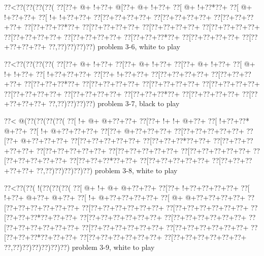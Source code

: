 \vbox{\vbox{\goo
\0??<\0??(\0??(\0??(\0??(
\0??[\0??+\- @+\- !+\0??+
\- @[\0??+\- @+\- !+\0??+
\0??[\- @+\- !+\0??*\0??+
\0??[\- @+\- !+\0??+\0??+
\0??[\- !+\- !+\0??+\0??+
\0??[\0??+\0??+\0??+\0??+
\0??[\0??+\0??+\0??+\0??+
\0??[\0??+\0??+\0??+\0??+
\0??[\0??+\0??+\0??*\0??+
\0??[\0??+\0??+\0??+\0??+
\0??[\0??+\0??+\0??+\0??+
\0??[\0??+\0??+\0??+\0??+
\0??[\0??+\0??+\0??+\0??+
\0??[\0??+\0??+\0??+\0??+
\0??[\0??+\0??+\0??*\0??+
\0??[\0??+\0??+\0??+\0??+
\0??[\0??+\0??+\0??+\0??+
\0??,\0??)\0??)\0??)\0??)
}
\hfil problem 3-6, white to play\hfil\break
}

\vbox{\vbox{\goo
\0??<\0??(\0??(\0??(\0??(
\0??[\0??+\- @+\- !+\0??+
\0??[\0??+\- @+\- !+\0??+
\0??[\0??+\- @+\- !+\0??+
\0??[\- @+\- !+\- !+\0??+
\0??[\- !+\0??+\0??+\0??+
\0??[\0??+\- !+\0??+\0??+
\0??[\0??+\0??+\0??+\0??+
\0??[\0??+\0??+\0??+\0??+
\0??[\0??+\0??+\0??*\0??+
\0??[\0??+\0??+\0??+\0??+
\0??[\0??+\0??+\0??+\0??+
\0??[\0??+\0??+\0??+\0??+
\0??[\0??+\0??+\0??+\0??+
\0??[\0??+\0??+\0??+\0??+
\0??[\0??+\0??+\0??*\0??+
\0??[\0??+\0??+\0??+\0??+
\0??[\0??+\0??+\0??+\0??+
\0??,\0??)\0??)\0??)\0??)
}
\hfil problem 3-7, black to play\hfil\break
}

\vbox{\vbox{\goo
\0??<\- @(\0??(\0??(\0??(\0??(
\0??[\- !+\- @+\- @+\0??+\0??+
\0??[\0??+\- !+\- !+\- @+\0??+
\0??[\- !+\0??+\0??*\- @+\0??+
\0??[\- !+\- @+\0??+\0??+\0??+
\0??[\0??+\- @+\0??+\0??+\0??+
\0??[\0??+\0??+\0??+\0??+\0??+
\0??[\0??+\- @+\0??+\0??+\0??+
\0??[\0??+\0??+\0??+\0??+\0??+
\0??[\0??+\0??+\0??*\0??+\0??+
\0??[\0??+\0??+\0??+\0??+\0??+
\0??[\0??+\0??+\0??+\0??+\0??+
\0??[\0??+\0??+\0??+\0??+\0??+
\0??[\0??+\0??+\0??+\0??+\0??+
\0??[\0??+\0??+\0??+\0??+\0??+
\0??[\0??+\0??+\0??*\0??+\0??+
\0??[\0??+\0??+\0??+\0??+\0??+
\0??[\0??+\0??+\0??+\0??+\0??+
\0??,\0??)\0??)\0??)\0??)\0??)
}
\hfil problem 3-8, white to play\hfil\break
}

\vbox{\vbox{\goo
\0??<\0??(\0??(\- !(\0??(\0??(\0??(
\0??[\- @+\- !+\- @+\- @+\0??+\0??+
\0??[\0??+\- !+\0??+\0??+\0??+\0??+
\0??[\- !+\0??+\- @+\0??+\- @+\0??+
\0??[\- !+\- @+\0??+\0??+\0??+\0??+
\0??[\- @+\- @+\0??+\0??+\0??+\0??+
\0??[\0??+\0??+\0??+\0??+\0??+\0??+
\0??[\0??+\0??+\0??+\0??+\0??+\0??+
\0??[\0??+\0??+\0??+\0??+\0??+\0??+
\0??[\0??+\0??+\0??*\0??+\0??+\0??+
\0??[\0??+\0??+\0??+\0??+\0??+\0??+
\0??[\0??+\0??+\0??+\0??+\0??+\0??+
\0??[\0??+\0??+\0??+\0??+\0??+\0??+
\0??[\0??+\0??+\0??+\0??+\0??+\0??+
\0??[\0??+\0??+\0??+\0??+\0??+\0??+
\0??[\0??+\0??+\0??*\0??+\0??+\0??+
\0??[\0??+\0??+\0??+\0??+\0??+\0??+
\0??[\0??+\0??+\0??+\0??+\0??+\0??+
\0??,\0??)\0??)\0??)\0??)\0??)\0??)
}
\hfil problem 3-9, white to play\hfil\break
}

